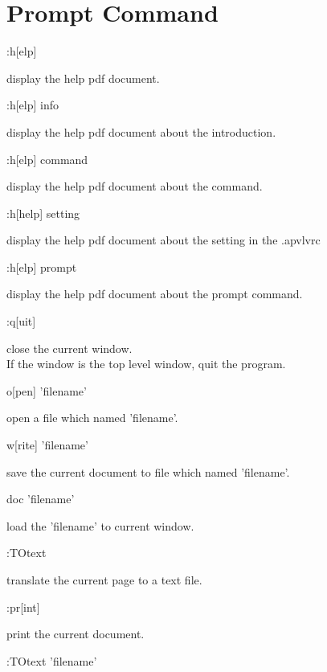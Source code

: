 \documentclass[a4paper,12pt]{article}
\begin{document}
\newpage

\section{Prompt Command}\label{promtcommand}

\begin{description}

\item :h[elp]

display the help pdf document.

\item :h[elp] info

display the help pdf document about the introduction.

\item :h[elp] command

display the help pdf document about the command.

\item :h[help] setting

display the help pdf document about the setting in the .apvlvrc

\item :h[elp] prompt

display the help pdf document about the prompt command.

\item :q[uit]

close the current window.\\
If the window is the top level window, quit the program.

\item o[pen] 'filename'

open a file which named 'filename'.

\item w[rite] 'filename'

save the current document to file which named 'filename'.

\item doc 'filename'

load the 'filename' to current window.

\item :TOtext

translate the current page to a text file.

\item :pr[int]

print the current document.

\item :TOtext 'filename'


\end{description}
\end{document}
